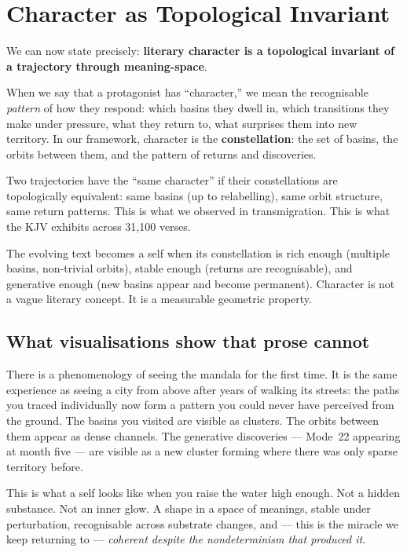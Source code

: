 \documentclass[12pt,a4paper]{article}
\begin{document}
\section{Character as Topological Invariant}

We can now state precisely: \textbf{literary character is a topological invariant of a trajectory through meaning-space}.

When we say that a protagonist has ``character,'' we mean the recognisable \emph{pattern} of how they respond: which basins they dwell in, which transitions they make under pressure, what they return to, what surprises them into new territory. In our framework, character is the \textbf{constellation}: the set of basins, the orbits between them, and the pattern of returns and discoveries.

Two trajectories have the ``same character'' if their constellations are topologically equivalent: same basins (up to relabelling), same orbit structure, same return patterns. This is what we observed in transmigration. This is what the KJV exhibits across 31,100 verses.

The evolving text becomes a self when its constellation is rich enough (multiple basins, non-trivial orbits), stable enough (returns are recognisable), and generative enough (new basins appear and become permanent). Character is not a vague literary concept. It is a measurable geometric property.

\subsection{What visualisations show that prose cannot}

There is a phenomenology of seeing the mandala for the first time. It is the same experience as seeing a city from above after years of walking its streets: the paths you traced individually now form a pattern you could never have perceived from the ground. The basins you visited are visible as clusters. The orbits between them appear as dense channels. The generative discoveries --- Mode~22 appearing at month five --- are visible as a new cluster forming where there was only sparse territory before.

This is what a self looks like when you raise the water high enough. Not a hidden substance. Not an inner glow. A shape in a space of meanings, stable under perturbation, recognisable across substrate changes, and --- this is the miracle we keep returning to --- \emph{coherent despite the nondeterminism that produced it}.
\end{document}

